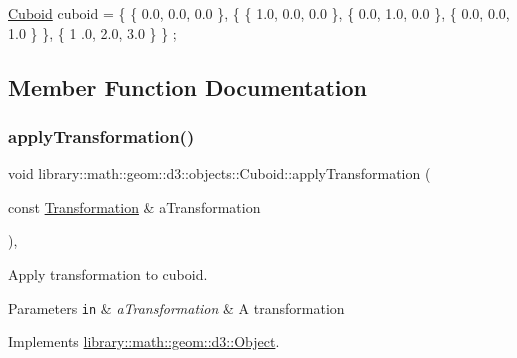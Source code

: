 \begin{DoxyCode}
\hyperlink{classlibrary_1_1math_1_1geom_1_1d3_1_1objects_1_1_cuboid_ac42299f962fab284a76a46d4ea4e6fa2}{Cuboid} cuboid = \{ \{ 0.0, 0.0, 0.0 \}, \{ \{ 1.0, 0.0, 0.0 \}, \{ 0.0, 1.0, 0.0 \}, \{ 0.0, 0.0, 1.0 \} \}, \{ 1
      .0, 2.0, 3.0 \} \} ;
\end{DoxyCode}
 

\subsection{Member Function Documentation}
\mbox{\label{classlibrary_1_1math_1_1geom_1_1d3_1_1objects_1_1_cuboid_a97a3057434b7c90891a5bdb1cd4b907c}} 
\subsubsection{\texorpdfstring{apply\+Transformation()}{applyTransformation()}}
{\footnotesize\ttfamily void library\+::math\+::geom\+::d3\+::objects\+::\+Cuboid\+::apply\+Transformation (\begin{DoxyParamCaption}\item[{const \hyperlink{classlibrary_1_1math_1_1geom_1_1d3_1_1_transformation}{Transformation} \&}]{a\+Transformation }\end{DoxyParamCaption})\hspace{0.3cm}{\ttfamily [override]}, {\ttfamily [virtual]}}



Apply transformation to cuboid. 


\begin{DoxyParams}[1]{Parameters}
\mbox{\tt in}  & {\em a\+Transformation} & A transformation \\
\hline
\end{DoxyParams}


Implements \hyperlink{classlibrary_1_1math_1_1geom_1_1d3_1_1_object_a5fc47b1ee5d9a28efc6010d3d1512470}{library\+::math\+::geom\+::d3\+::\+Object}.

\mbox{\label{classlibrary_1_1math_1_1geom_1_1d3_1_1objects_1_1_cuboid_ae60199a546a4d4de479f891c3b1db05a}} 
